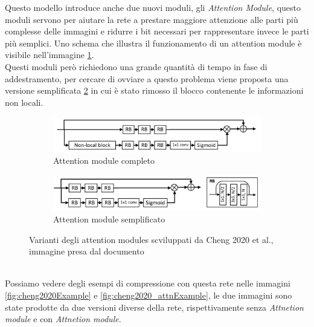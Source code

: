 Questo modello introduce anche due nuovi moduli, gli \textit{Attention Module}, questo moduli servono per aiutare la rete a prestare maggiore attenzione alle parti più complesse delle immagini e ridurre i bit necessari per rappresentare invece le parti più semplici. Uno schema che illustra il funzionamento di un attention module è visibile nell’immagine \ref{fig:cheng2020AttnModuleA}.\\
Questi moduli però richiedono una grande quantità di tempo in fase di addestramento, per cercare di ovviare a questo problema viene proposta una versione semplificata \ref{fig:cheng2020AttnModuleB} in cui è stato rimosso il blocco contenente le informazioni non locali.\\
\begin{figure}[h!]
    \centering
    \begin{subfigure}[]{0.6\textwidth}
        \includegraphics[width=\textwidth]{Immagini/Cheng2020_AttnModuleA.png}
        \caption{Attention module completo}
        \label{fig:cheng2020AttnModuleA}
    \end{subfigure}
    \vspace*{1.5cm}
    \begin{subfigure}[]{0.6\textwidth}
        \includegraphics[width=\textwidth]{Immagini/Cheng2020_AttnModuleB.png}
        \caption{Attention module semplificato}
        \label{fig:cheng2020AttnModuleB}
    \end{subfigure}
    \caption{Varianti degli attention modules scviluppati da Cheng 2020 et al., immagine presa dal documento \cite{cheng2020learned}}
    \label{fig:cheng2020AttnModule}
\end{figure}\\
Possiamo vedere degli esempi di compressione con questa rete nelle immagini \ref{fig:cheng2020Example} e \ref{fig:cheng2020_attnExample}, le due immagini sono state prodotte da due versioni diverse della rete, rispettivamente senza \textit{Attnetion module} e con \textit{Attnetion module}.\\
\newpage

